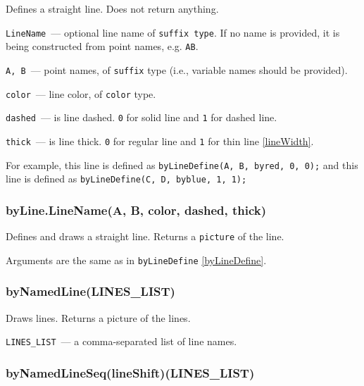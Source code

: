 	Defines a straight line. Does not return anything.
	
	\texttt{LineName}~— optional line name of \texttt{suffix type}. If no name is provided, it is being constructed from point names, e.g. \texttt{AB}.
	
	\texttt{A, B}~— point names, of \texttt{suffix} type (i.e., variable names should be provided).
	
	\texttt{color}~— line color, of \texttt{color} type.
	
	\texttt{dashed}~— is line dashed. \texttt{0} for solid line and \texttt{1} for dashed line.
	
	\texttt{thick}~— is line thick. \texttt{0} for regular line and \texttt{1} for thin line \ref{lineWidth}.

	For example, this line  is defined as \texttt{byLineDefine(A, B, byred, 0, 0);} and this line  is defined as \texttt{byLineDefine(C, D, byblue, 1, 1);}


\subsubsection{byLine.LineName(A, B, color, dashed, thick)}\label{byLine}

	Defines and draws a straight line. Returns a \texttt{picture} of the line.
	
	Arguments are the same as in \texttt{byLineDefine} \ref{byLineDefine}.


\subsubsection{byNamedLine(LINES\_LIST)}\label{byNamedLine}

	Draws lines. Returns a picture of the lines.
	
	\texttt{LINES\_LIST}~— a comma-separated list of line names.

\subsubsection{byNamedLineSeq(lineShift)(LINES\_LIST)}\label{byNamedLineSeq}

		
